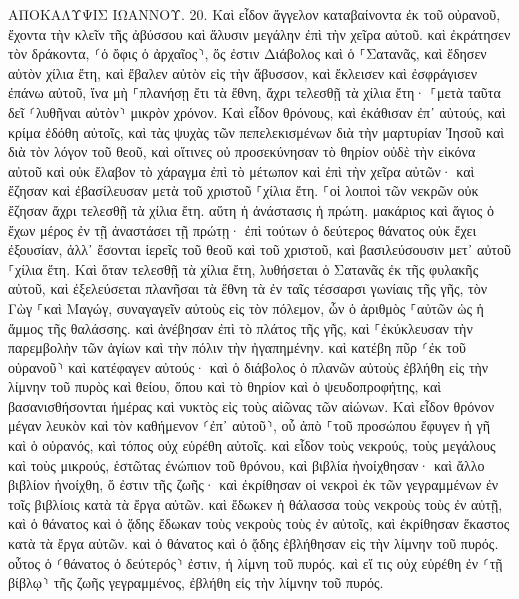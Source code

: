\documentclass[twoside, 9pt]{extreport}
\begin{document}
ΑΠΟΚΑΛΥΨΙΣ ΙΩΑΝΝΟΥ.
20.
Καὶ εἶδον ἄγγελον καταβαίνοντα ἐκ τοῦ οὐρανοῦ, ἔχοντα τὴν κλεῖν τῆς ἀβύσσου καὶ ἅλυσιν μεγάλην ἐπὶ τὴν χεῖρα αὐτοῦ. 
καὶ ἐκράτησεν τὸν δράκοντα, ⸂ὁ ὄφις ὁ ἀρχαῖος⸃, ὅς ἐστιν Διάβολος καὶ ὁ ⸀Σατανᾶς, καὶ ἔδησεν αὐτὸν χίλια ἔτη, 
καὶ ἔβαλεν αὐτὸν εἰς τὴν ἄβυσσον, καὶ ἔκλεισεν καὶ ἐσφράγισεν ἐπάνω αὐτοῦ, ἵνα μὴ ⸀πλανήσῃ ἔτι τὰ ἔθνη, ἄχρι τελεσθῇ τὰ χίλια ἔτη· ⸀μετὰ ταῦτα δεῖ ⸂λυθῆναι αὐτὸν⸃ μικρὸν χρόνον. 
Καὶ εἶδον θρόνους, καὶ ἐκάθισαν ἐπ᾽ αὐτούς, καὶ κρίμα ἐδόθη αὐτοῖς, καὶ τὰς ψυχὰς τῶν πεπελεκισμένων διὰ τὴν μαρτυρίαν Ἰησοῦ καὶ διὰ τὸν λόγον τοῦ θεοῦ, καὶ οἵτινες οὐ προσεκύνησαν τὸ θηρίον οὐδὲ τὴν εἰκόνα αὐτοῦ καὶ οὐκ ἔλαβον τὸ χάραγμα ἐπὶ τὸ μέτωπον καὶ ἐπὶ τὴν χεῖρα αὐτῶν· καὶ ἔζησαν καὶ ἐβασίλευσαν μετὰ τοῦ χριστοῦ ⸀χίλια ἔτη. 
⸀οἱ λοιποὶ τῶν νεκρῶν οὐκ ἔζησαν ἄχρι τελεσθῇ τὰ χίλια ἔτη. αὕτη ἡ ἀνάστασις ἡ πρώτη. 
μακάριος καὶ ἅγιος ὁ ἔχων μέρος ἐν τῇ ἀναστάσει τῇ πρώτῃ· ἐπὶ τούτων ὁ δεύτερος θάνατος οὐκ ἔχει ἐξουσίαν, ἀλλ᾽ ἔσονται ἱερεῖς τοῦ θεοῦ καὶ τοῦ χριστοῦ, καὶ βασιλεύσουσιν μετ᾽ αὐτοῦ ⸀χίλια ἔτη. 
Καὶ ὅταν τελεσθῇ τὰ χίλια ἔτη, λυθήσεται ὁ Σατανᾶς ἐκ τῆς φυλακῆς αὐτοῦ, 
καὶ ἐξελεύσεται πλανῆσαι τὰ ἔθνη τὰ ἐν ταῖς τέσσαρσι γωνίαις τῆς γῆς, τὸν Γὼγ ⸀καὶ Μαγώγ, συναγαγεῖν αὐτοὺς εἰς τὸν πόλεμον, ὧν ὁ ἀριθμὸς ⸀αὐτῶν ὡς ἡ ἄμμος τῆς θαλάσσης. 
καὶ ἀνέβησαν ἐπὶ τὸ πλάτος τῆς γῆς, καὶ ⸀ἐκύκλευσαν τὴν παρεμβολὴν τῶν ἁγίων καὶ τὴν πόλιν τὴν ἠγαπημένην. καὶ κατέβη πῦρ ⸂ἐκ τοῦ οὐρανοῦ⸃ καὶ κατέφαγεν αὐτούς· 
καὶ ὁ διάβολος ὁ πλανῶν αὐτοὺς ἐβλήθη εἰς τὴν λίμνην τοῦ πυρὸς καὶ θείου, ὅπου καὶ τὸ θηρίον καὶ ὁ ψευδοπροφήτης, καὶ βασανισθήσονται ἡμέρας καὶ νυκτὸς εἰς τοὺς αἰῶνας τῶν αἰώνων. 
Καὶ εἶδον θρόνον μέγαν λευκὸν καὶ τὸν καθήμενον ⸂ἐπ᾽ αὐτοῦ⸃, οὗ ἀπὸ ⸀τοῦ προσώπου ἔφυγεν ἡ γῆ καὶ ὁ οὐρανός, καὶ τόπος οὐχ εὑρέθη αὐτοῖς. 
καὶ εἶδον τοὺς νεκρούς, τοὺς μεγάλους καὶ τοὺς μικρούς, ἑστῶτας ἐνώπιον τοῦ θρόνου, καὶ βιβλία ἠνοίχθησαν· καὶ ἄλλο βιβλίον ἠνοίχθη, ὅ ἐστιν τῆς ζωῆς· καὶ ἐκρίθησαν οἱ νεκροὶ ἐκ τῶν γεγραμμένων ἐν τοῖς βιβλίοις κατὰ τὰ ἔργα αὐτῶν. 
καὶ ἔδωκεν ἡ θάλασσα τοὺς νεκροὺς τοὺς ἐν αὐτῇ, καὶ ὁ θάνατος καὶ ὁ ᾅδης ἔδωκαν τοὺς νεκροὺς τοὺς ἐν αὐτοῖς, καὶ ἐκρίθησαν ἕκαστος κατὰ τὰ ἔργα αὐτῶν. 
καὶ ὁ θάνατος καὶ ὁ ᾅδης ἐβλήθησαν εἰς τὴν λίμνην τοῦ πυρός. οὗτος ὁ ⸂θάνατος ὁ δεύτερός⸃ ἐστιν, ἡ λίμνη τοῦ πυρός. 
καὶ εἴ τις οὐχ εὑρέθη ἐν ⸂τῇ βίβλῳ⸃ τῆς ζωῆς γεγραμμένος, ἐβλήθη εἰς τὴν λίμνην τοῦ πυρός. 
\end{document}

